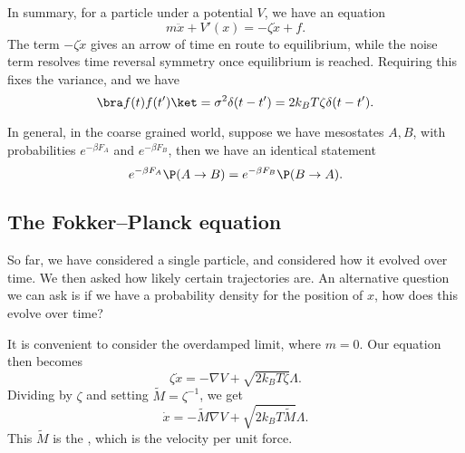 \documentclass[a4paper]{article}
\begin{document}
In summary, for a particle under a potential $V$, we have an equation
\[
  m\ddot{x} + V'(x) = - \zeta \dot{x} + f.
\]
The term $-\zeta \dot{x}$ gives an arrow of time en route to equilibrium, while the noise term resolves time reversal symmetry once equilibrium is reached. Requiring this fixes the variance, and we have
\[
  \bra f(t) f(t')\ket = \sigma^2 \delta(t - t') = 2 k_B T \zeta \delta(t - t').
\]

In general, in the coarse grained world, suppose we have mesostates $A, B$, with probabilities $e^{-\beta F_A}$ and $e^{-\beta F_B}$, then we have an identical statement
\[
  e^{-\beta F_A} \P(A \to B) = e^{-\beta F_B} \P(B \to A).
\]

\subsection{The Fokker--Planck equation}
So far, we have considered a single particle, and considered how it evolved over time. We then asked how likely certain trajectories are. An alternative question we can ask is if we have a probability density for the position of $x$, how does this evolve over time?

It is convenient to consider the overdamped limit, where $m = 0$. Our equation then becomes
\[
  \zeta \dot{x} = - \nabla V + \sqrt{2k_B T \zeta} \Lambda.
\]
Dividing by $\zeta$ and setting $\tilde{M} = \zeta^{-1}$, we get
\[
  \dot{x} = - \tilde{M} \nabla V + \sqrt{2k_B T \tilde{M}} \Lambda.
\]
This $\tilde{M}$ is the , which is the velocity per unit force.
\end{document}
